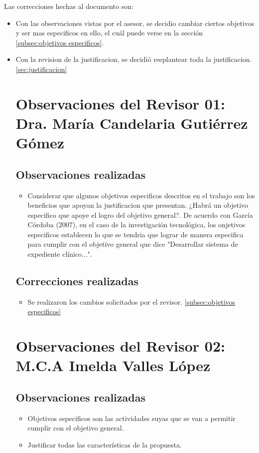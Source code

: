     Las correcciones hechas al documento son:
    \begin{itemize}
        \item  Con las observaciones vistas por el asesor, se decidio cambiar ciertos objetivos y ser mas especificos en ello, el cuál puede verse en la sección \ref{subsec:objetivos especificos}.
          \item Con la revision de la justificacion, se decidió reeplantear toda la justificacion.\ref{sec:justificacion}




\section{Observaciones del Revisor 01: Dra. María Candelaria Gutiérrez Gómez}

    \subsection{Observaciones realizadas}
    \begin{itemize}
      \item Considerar que algunos objetivos especificos descritos en el trabajo son los beneficios que apoyan la justificacion que presentan. ¿Habrá un objetivo especifico que apoye el logro del objetivo general?. De acuerdo con García Córdoba (2007), en el caso de la investigación tecnológica, los onjetivos especificos establecen lo que se tendria que lograr de manera especifica para cumplir con el objetivo general que dice "Desarrollar sistema de expediente clínico...".
    \end{itemize}

    \subsection{Correcciones realizadas}
    \begin{itemize}
      \item Se realizaron los cambios solicitados por el revisor. \ref{subsec:objetivos especificos}
    \end{itemize}



\section{Observaciones del Revisor 02: M.C.A Imelda Valles López}

    \subsection{Observaciones realizadas}
    \begin{itemize}
      \item Objetivos especificos son las actividades suyas que se van a permitir cumplir con el objetivo general.
      \item Justificar todas las características de la propuesta.
    \end{itemize}


\end{itemize}
